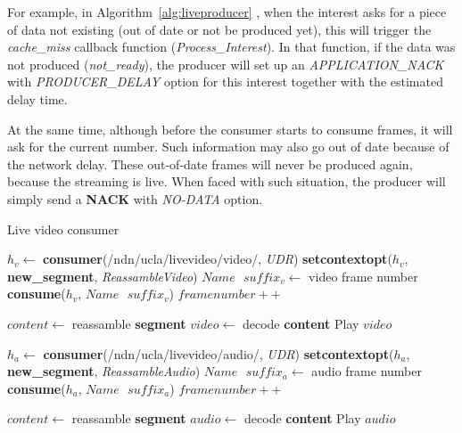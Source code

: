 For example, in Algorithm~\ref{alg:liveproducer} , when the interest asks for a piece of data not existing (out of date or not be produced yet), this will trigger the \textit{cache\_miss} callback function (\textit{Process\_Interest}). In that function, if the data was not produced (\textit{not\_ready}), the producer will set up an \textit{APPLICATION\_NACK} with \textit{PRODUCER\_DELAY} option for this interest together with the estimated delay time.

At the same time, although before the consumer starts to consume frames, it will ask for the current number. Such information may also go out of date because of the network delay. These out-of-date frames will never be produced again, because the streaming is live. When faced with such situation, the producer will simply send a \textbf{NACK} with \textit{NO-DATA} option.

\begin{algorithm}[hbtp]
\caption{Live video consumer}
\label{alg:liveconsumer}
\begin{algorithmic}[2]
\State $h_v \leftarrow $ \textbf{consumer}(/ndn/ucla/livevideo/video/, \textit{UDR})
\State \textbf{setcontextopt}($h_v$, \textbf{new\_segment}, \textit{ReassambleVideo})
\vspace{0.2cm}
	\State $Name \textbf{ } suffix_v \leftarrow $ video frame number
	\State \textbf{consume}($h_v$, $Name\textbf{ }suffix_v$)
	\State $framenumber ++$
	\EndWhile
\vspace{0.2cm}

    \State $content \leftarrow $ reassamble \textbf{segment}
		\State $video \leftarrow $ decode \textbf{content}
	   	\State Play $video$
	\EndIf
\EndFunction

\vspace{0.4cm}

\State $h_a \leftarrow $ \textbf{consumer}(/ndn/ucla/livevideo/audio/, \textit{UDR})
\State \textbf{setcontextopt}($h_a$, \textbf{new\_segment}, \textit{ReassambleAudio})
\vspace{0.2cm}
	\State $Name \textbf{ } suffix_a \leftarrow $ audio frame number
	\State \textbf{consume}($h_a$, $Name\textbf{ }suffix_a$)
	\State $framenumber ++$
	\EndWhile
\vspace{0.2cm}

    \State $content \leftarrow $ reassamble \textbf{segment}
		\State $audio \leftarrow $ decode \textbf{content}
	   	\State Play $audio$
	\EndIf
\EndFunction
\end{algorithmic}
\end{algorithm}

